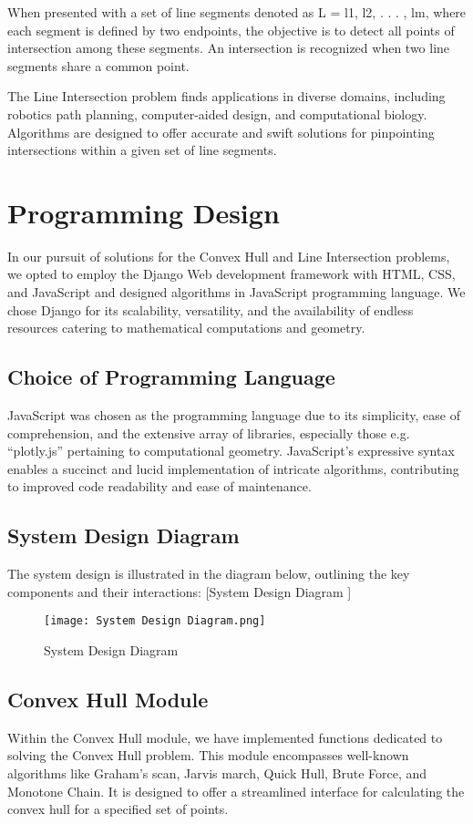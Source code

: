 \documentclass[10pt,twocolumn]{article}
\begin{document}
    When presented with a set of line segments denoted as L = {l1, l2, . . . , lm}, where each segment is defined by two endpoints, the objective is to detect all points of intersection among these segments. An intersection is recognized when two line segments share a common point.
    
    The Line Intersection problem finds applications in diverse domains, including robotics path planning, computer-aided design, and computational biology. Algorithms are designed to offer accurate and swift solutions for pinpointing intersections within a given set of line segments.


\section{Programming Design}
    In our pursuit of solutions for the Convex Hull and Line Intersection problems, we opted to employ the Django Web development framework with HTML, CSS, and JavaScript and designed algorithms in JavaScript programming language. We chose Django for its scalability, versatility, and the availability of endless resources catering to mathematical computations and geometry.

    \subsection{Choice of Programming Language}
        JavaScript was chosen as the programming language due to its simplicity, ease of comprehension, and the extensive array of libraries, especially those e.g. “plotly.js” pertaining to computational geometry. JavaScript's expressive syntax enables a succinct and lucid implementation of intricate algorithms, contributing to improved code readability and ease of maintenance.

    \subsection{System Design Diagram}
        The system design is illustrated in the diagram below, outlining the key components and their interactions:
        [System Design Diagram ]
        \begin{figure}
            \texttt{[image: System Design Diagram.png]}
            \caption{System Design Diagram}
            \label{fig:enter-label}
        \end{figure}
        
    \subsection{Convex Hull Module}
        Within the Convex Hull module, we have implemented functions dedicated to solving the Convex Hull problem. This module encompasses well-known algorithms like Graham’s scan, Jarvis march, Quick Hull, Brute Force, and Monotone Chain. It is designed to offer a streamlined interface for calculating the convex hull for a specified set of points.
\end{document}
